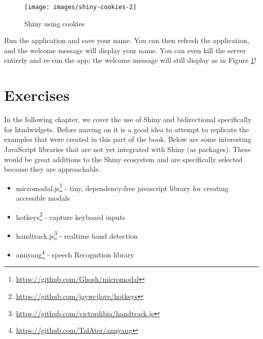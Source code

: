 \documentclass[10pt,]{krantz}
\makeatletter
\newenvironment{Shaded}{\begin{snugshade}}{\end{snugshade}}
\newcommand{\CommentTok}[1]{\textcolor[rgb]{0.37,0.37,0.37}{\textit{#1}}}
\newcommand{\ControlFlowTok}[1]{\textcolor[rgb]{0.27,0.27,0.27}{\textbf{#1}}}
\newcommand{\KeywordTok}[1]{\textcolor[rgb]{0.27,0.27,0.27}{\textbf{#1}}}
\newcommand{\NormalTok}[1]{#1}
\newcommand{\OperatorTok}[1]{\textcolor[rgb]{0.43,0.43,0.43}{\textbf{#1}}}
\newcommand{\StringTok}[1]{\textcolor[rgb]{0.5,0.5,0.5}{#1}}
\providecommand{\tightlist}{%
  \setlength{\itemsep}{0pt}\setlength{\parskip}{0pt}}
\renewcommand{\href}[2]{#2\footnote{\url{#1}}}
\newenvironment{kframe}{%
\medskip{}
\setlength{\fboxsep}{.8em}
 \def\at@end@of@kframe{}%
 \ifinner\ifhmode%
  \def\at@end@of@kframe{\end{minipage}}%
  \begin{minipage}{\columnwidth}%
 \fi\fi%
 \def\FrameCommand##1{\hskip\@totalleftmargin \hskip-\fboxsep
 \colorbox{shadecolor}{##1}\hskip-\fboxsep
     \hskip-\linewidth \hskip-\@totalleftmargin \hskip\columnwidth}%
 \MakeFramed {\advance\hsize-\width
   \@totalleftmargin\z@ \linewidth\hsize
   \@setminipage}}%
 {\par\unskip\endMakeFramed%
 \at@end@of@kframe}
\renewenvironment{Shaded}{\begin{kframe}}{\end{kframe}}
\makeatother
\begin{document}
\begin{Shaded}
\end{Shaded}

\begin{figure}[H]

{\centering \texttt{[image: images/shiny-cookies-2]} 

}

\caption{Shiny using cookies}\label{fig:shiny-cookies}
\end{figure}

Run the application and save your name. You can then refresh the application, and the welcome message will display your name. You can even kill the server entirely and re-run the app; the welcome message will still display as in Figure \ref{fig:shiny-cookies}!

\hypertarget{shiny-cookies-exercises}{%
\section{Exercises}\label{shiny-cookies-exercises}}

In the following chapter, we cover the use of Shiny and bidirectional specifically for htmlwidgets. Before moving on it is a good idea to attempt to replicate the examples that were created in this part of the book. Below are some interesting JavaScript libraries that are not yet integrated with Shiny (as packages). These would be great additions to the Shiny ecosystem and are specifically selected because they are approachable.

\begin{itemize}
\tightlist
\item
  \href{https://github.com/Ghosh/micromodal}{micromodal.js} - tiny, dependency-free javascript library for creating accessible modals
\item
  \href{https://github.com/jaywcjlove/hotkeys}{hotkeys} - capture keyboard inputs
\item
  \href{https://github.com/victordibia/handtrack.js}{handtrack.js} - realtime hand detection
\item
  \href{https://github.com/TalAter/annyang}{annyang} - speech Recognition library
\end{itemize}
\end{document}
